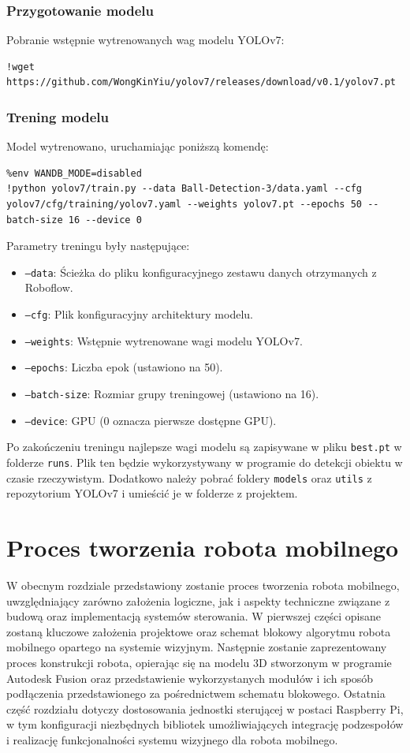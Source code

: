 \documentclass[a4paper,twoside,12pt]{book}
\begin{document}
\subsection{Przygotowanie modelu}
Pobranie wstępnie wytrenowanych wag modelu YOLOv7:
\begin{verbatim}
!wget https://github.com/WongKinYiu/yolov7/releases/download/v0.1/yolov7.pt
\end{verbatim}

\subsection{Trening modelu}
Model wytrenowano, uruchamiając poniższą komendę:
\begin{verbatim}
%env WANDB_MODE=disabled
!python yolov7/train.py --data Ball-Detection-3/data.yaml --cfg yolov7/cfg/training/yolov7.yaml --weights yolov7.pt --epochs 50 --batch-size 16 --device 0
\end{verbatim}
Parametry treningu były następujące:
\begin{itemize}
    \item \texttt{--data}: Ścieżka do pliku konfiguracyjnego zestawu danych otrzymanych z Roboflow.
    \item \texttt{--cfg}: Plik konfiguracyjny architektury modelu.
    \item \texttt{--weights}: Wstępnie wytrenowane wagi modelu YOLOv7.
    \item \texttt{--epochs}: Liczba epok (ustawiono na 50).
    \item \texttt{--batch-size}: Rozmiar grupy treningowej (ustawiono na 16).
    \item \texttt{--device}: GPU (0 oznacza pierwsze dostępne GPU).
\end{itemize}
Po zakończeniu treningu najlepsze wagi modelu są zapisywane w pliku \texttt{best.pt} w folderze \texttt{runs}. Plik ten będzie wykorzystywany w programie do detekcji obiektu w czasie rzeczywistym.
Dodatkowo należy pobrać foldery \texttt{models} oraz \texttt{utils} z repozytorium YOLOv7 i umieścić je w folderze z projektem.

\chapter{Proces tworzenia robota mobilnego}
\label{ch:04}
W obecnym rozdziale przedstawiony zostanie proces tworzenia robota mobilnego, uwzględniający zarówno założenia logiczne, jak i aspekty techniczne związane z budową oraz implementacją systemów sterowania. W pierwszej części opisane zostaną kluczowe założenia projektowe oraz schemat blokowy algorytmu robota mobilnego opartego na systemie wizyjnym. Następnie zostanie zaprezentowany proces konstrukcji robota, opierając się na modelu 3D stworzonym w programie Autodesk Fusion oraz przedstawienie wykorzystanych modułów i ich sposób podłączenia przedstawionego za pośrednictwem schematu blokowego. Ostatnia część rozdziału dotyczy dostosowania jednostki sterującej w postaci Raspberry Pi, w tym konfiguracji niezbędnych bibliotek umożliwiających integrację podzespołów i realizację funkcjonalności systemu wizyjnego dla robota mobilnego.
\end{document}
